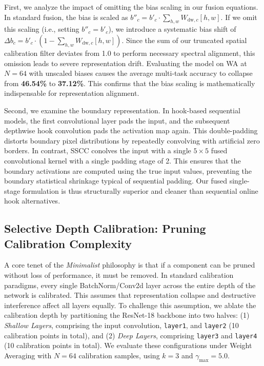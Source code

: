 \documentclass{article}
\theoremstyle{plain}
\theoremstyle{definition}
\theoremstyle{remark}
\begin{document}
First, we analyze the impact of omitting the bias scaling in our fusion equations. In standard fusion, the bias is scaled as $b''_c = b'_c \cdot \sum_{h, w} W_{\text{dw}, c}[h, w]$. If we omit this scaling (i.e., setting $b''_c = b'_c$), we introduce a systematic bias shift of $\Delta b_c = b'_c \cdot (1 - \sum_{h, w} W_{\text{dw}, c}[h, w])$. Since the sum of our truncated spatial calibration filter deviates from 1.0 to perform necessary spectral alignment, this omission leads to severe representation drift. Evaluating the model on WA at $N=64$ with unscaled biases causes the average multi-task accuracy to collapse from \textbf{46.54\%} to \textbf{37.12\%}. This confirms that the bias scaling is mathematically indispensable for representation alignment.

Second, we examine the boundary representation. In hook-based sequential models, the first convolutional layer pads the input, and the subsequent depthwise hook convolution pads the activation map again. This double-padding distorts boundary pixel distributions by repeatedly convolving with artificial zero borders. In contrast, SSCC conolves the input with a single $5 \times 5$ fused convolutional kernel with a single padding stage of 2. This ensures that the boundary activations are computed using the true input values, preventing the boundary statistical shrinkage typical of sequential padding. Our fused single-stage formulation is thus structurally superior and cleaner than sequential online hook alternatives.

\subsection{Selective Depth Calibration: Pruning Calibration Complexity}
A core tenet of the \textit{Minimalist} philosophy is that if a component can be pruned without loss of performance, it must be removed. In standard calibration paradigms, every single BatchNorm/Conv2d layer across the entire depth of the network is calibrated. This assumes that representation collapse and destructive interference affect all layers equally. To challenge this assumption, we ablate the calibration depth by partitioning the ResNet-18 backbone into two halves: (1) \textit{Shallow Layers}, comprising the input convolution, \texttt{layer1}, and \texttt{layer2} (10 calibration points in total), and (2) \textit{Deep Layers}, comprising \texttt{layer3} and \texttt{layer4} (10 calibration points in total). We evaluate these configurations under Weight Averaging with $N=64$ calibration samples, using $k=3$ and $\gamma_{\text{max}} = 5.0$.
\end{document}
